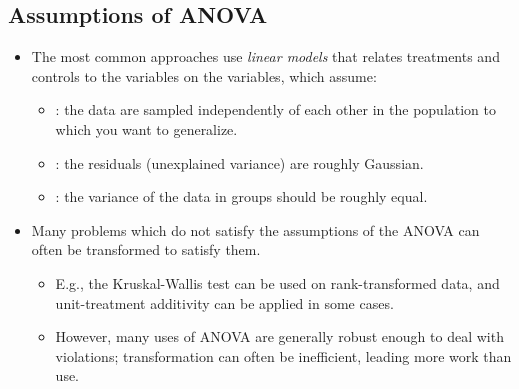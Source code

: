 \begin{itemize}
  \subsection{Assumptions of ANOVA}
  \begin{itemize}
    \item The most common approaches use \emph{linear models} that relates treatments and controls to the  variables on the  variables, which assume:
      \begin{itemize}
        \item {}: the data are sampled independently of each other in the population to which you want to generalize.
        \item {}: the residuals (unexplained variance) are roughly Gaussian.
        \item {}: the variance of the data in groups should be roughly equal.
      \end{itemize}
    \item Many problems which do not satisfy the assumptions of the ANOVA can often be transformed to satisfy them. 
      \begin{itemize}
        \item E.g., the Kruskal-Wallis test can be used on rank-transformed data, and unit-treatment additivity can be applied in some cases.
        \item However, many uses of ANOVA are generally robust enough to deal with violations; transformation can often be inefficient, leading more work than use.
      \end{itemize}
  \end{itemize}
  

  
\end{itemize}


